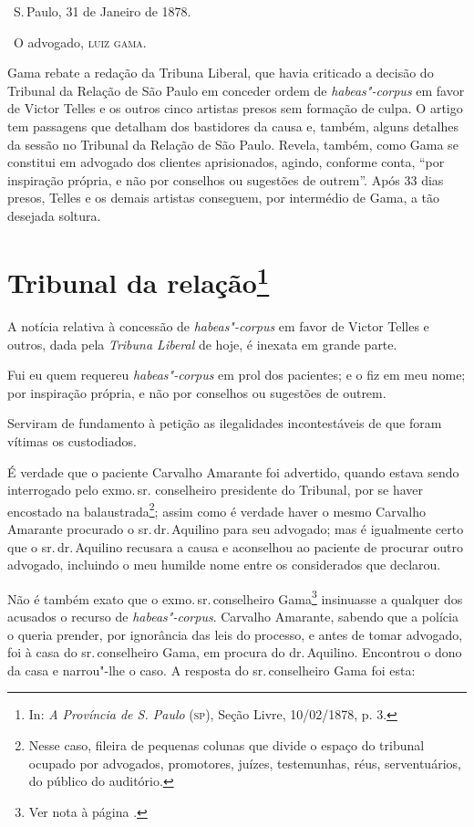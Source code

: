 \bigskip

\hfill\ S.\,Paulo, 31 de Janeiro de 1878.\smallskip

\hfill\ O advogado, \textsc{luiz gama}.

\paginabranca
\mbox{}\vfill
\thispagestyle{empty}

{\small\noindent
Gama rebate a redação da Tribuna
Liberal, que havia criticado a decisão do Tribunal da Relação de São
Paulo em conceder ordem de \emph{habeas"-corpus} em favor de Victor
Telles e os outros cinco artistas presos sem formação de culpa. O artigo
tem passagens que detalham dos bastidores da causa e, também, alguns
detalhes da sessão no Tribunal da Relação de São Paulo. Revela, também,
como Gama se constitui em advogado dos clientes aprisionados, agindo,
conforme conta, ``por inspiração própria, e não por conselhos ou
sugestões de outrem''. Após 33 dias presos, Telles e os demais artistas
conseguem, por intermédio de Gama, a tão desejada soltura. }

\chapter{Tribunal da relação\footnote[*]{In: \emph{A Província de S.
  Paulo} (\textsc{sp}), Seção Livre, 10/02/1878, p. 3.}}

A notícia relativa à concessão de \emph{habeas"-corpus} em favor de
Victor Telles e outros, dada pela \emph{Tribuna Liberal} de hoje, é
inexata em grande parte.

Fui eu quem requereu \emph{habeas"-corpus} em prol dos pacientes; e o fiz
em meu nome; por inspiração própria, e não por conselhos ou sugestões de
outrem.

Serviram de fundamento à petição as ilegalidades incontestáveis de que
foram vítimas os custodiados.

É verdade que o paciente Carvalho Amarante foi advertido, quando estava
sendo interrogado pelo exmo.\,sr. conselheiro presidente do Tribunal, por
se haver encostado na balaustrada\footnote{Nesse caso, fileira de
  pequenas colunas que divide o espaço do tribunal ocupado por
  advogados, promotores, juízes, testemunhas, réus, serventuários, do
  público do auditório.}; assim como é verdade haver o mesmo Carvalho
Amarante procurado o sr.\,dr.\,Aquilino para seu advogado; mas é
igualmente certo que o sr.\,dr.\,Aquilino recusara a causa e aconselhou ao
paciente de procurar outro advogado, incluindo o meu humilde nome entre
os considerados que declarou.

Não é também exato que o exmo.\,sr.\,conselheiro Gama\footnote{Ver nota à página \pageref{agostinho}.} insinuasse a
qualquer dos acusados o recurso de \emph{habeas"-corpus}. Carvalho
Amarante, sabendo que a polícia o queria prender, por ignorância das
leis do processo, e antes de tomar advogado, foi à casa do sr.\,conselheiro Gama, em procura do dr.\,Aquilino. Encontrou o dono da casa e
narrou"-lhe o caso. A resposta do sr.\,conselheiro Gama foi esta:

